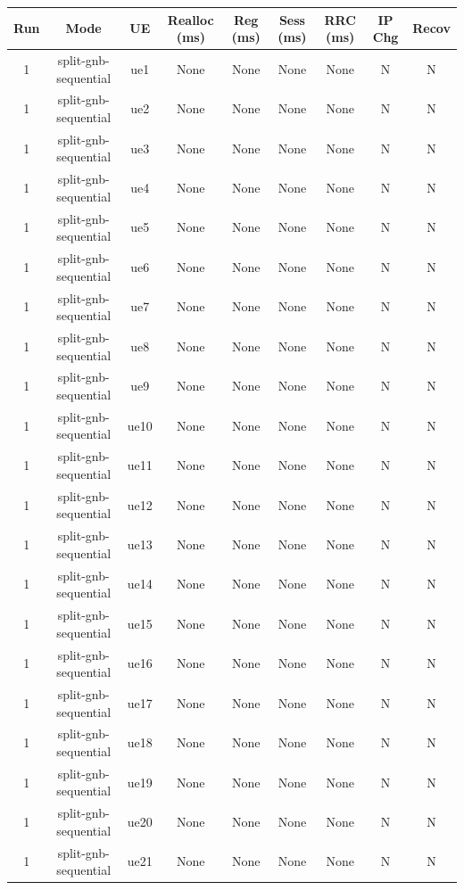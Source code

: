 \begin{table}[ht]
\centering
\begin{tabular}{|c|c|c|c|c|c|c|c|c|}
\hline
Run & Mode & UE & Realloc (ms) & Reg (ms) & Sess (ms) & RRC (ms) & IP Chg & Recov \\
\hline
1 & split-gnb-sequential & ue1 & None & None & None & None & N & N \\
1 & split-gnb-sequential & ue2 & None & None & None & None & N & N \\
1 & split-gnb-sequential & ue3 & None & None & None & None & N & N \\
1 & split-gnb-sequential & ue4 & None & None & None & None & N & N \\
1 & split-gnb-sequential & ue5 & None & None & None & None & N & N \\
1 & split-gnb-sequential & ue6 & None & None & None & None & N & N \\
1 & split-gnb-sequential & ue7 & None & None & None & None & N & N \\
1 & split-gnb-sequential & ue8 & None & None & None & None & N & N \\
1 & split-gnb-sequential & ue9 & None & None & None & None & N & N \\
1 & split-gnb-sequential & ue10 & None & None & None & None & N & N \\
1 & split-gnb-sequential & ue11 & None & None & None & None & N & N \\
1 & split-gnb-sequential & ue12 & None & None & None & None & N & N \\
1 & split-gnb-sequential & ue13 & None & None & None & None & N & N \\
1 & split-gnb-sequential & ue14 & None & None & None & None & N & N \\
1 & split-gnb-sequential & ue15 & None & None & None & None & N & N \\
1 & split-gnb-sequential & ue16 & None & None & None & None & N & N \\
1 & split-gnb-sequential & ue17 & None & None & None & None & N & N \\
1 & split-gnb-sequential & ue18 & None & None & None & None & N & N \\
1 & split-gnb-sequential & ue19 & None & None & None & None & N & N \\
1 & split-gnb-sequential & ue20 & None & None & None & None & N & N \\
1 & split-gnb-sequential & ue21 & None & None & None & None & N & N \\

\end{tabular}
\end{table}
